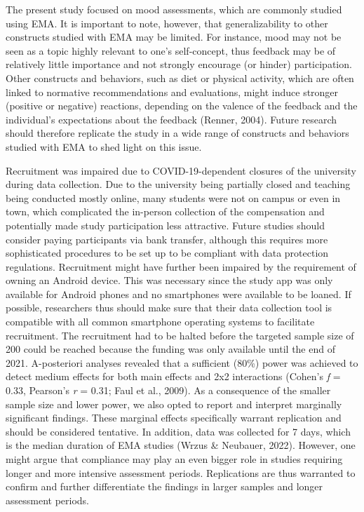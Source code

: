 \documentclass[authordate, empirical,issue]{jote-new-article}
\begin{document}
	The present study focused on mood assessments, which are commonly studied using EMA. It is important to note, however, that generalizability to other constructs studied with EMA may be limited. For instance, mood may not be seen as a topic highly relevant to one's self-concept, thus feedback may be of relatively little importance and not strongly encourage (or hinder) participation. Other constructs and behaviors, such as diet or physical activity, which are often linked to normative recommendations and evaluations, might induce stronger (positive or negative) reactions, depending on the valence of the feedback and the individual's expectations about the feedback (Renner, 2004). Future research should therefore replicate the study in a wide range of constructs and behaviors studied with EMA to shed light on this issue.



	Recruitment was impaired due to COVID-19-dependent closures of the university during data collection. Due to the university being partially closed and teaching being conducted mostly online, many students were not on campus or even in town, which complicated the in-person collection of the compensation and potentially made study participation less attractive. Future studies should consider paying participants via bank transfer, although this requires more sophisticated procedures to be set up to be compliant with data protection regulations. Recruitment might have further been impaired by the requirement of owning an Android device. This was necessary since the study app was only available for Android phones and no smartphones were available to be loaned. If possible, researchers thus should make sure that their data collection tool is compatible with all common smartphone operating systems to facilitate recruitment. The recruitment had to be halted before the targeted sample size of 200 could be reached because the funding was only available until the end of 2021. A-posteriori analyses revealed that a sufficient (80\%) power was achieved to detect medium effects for both main effects and 2x2 interactions (Cohen's \emph{f} = 0.33, Pearson's \emph{r} = 0.31; Faul et al., 2009). As a consequence of the smaller sample size and lower power, we also opted to report and interpret marginally significant findings. These marginal effects specifically warrant replication and should be considered tentative. In addition, data was collected for 7 days, which is the median duration of EMA studies (Wrzus \& Neubauer, 2022). However, one might argue that compliance may play an even bigger role in studies requiring longer and more intensive assessment periods. Replications are thus warranted to confirm and further differentiate the findings in larger samples and longer assessment periods.
\end{document}
